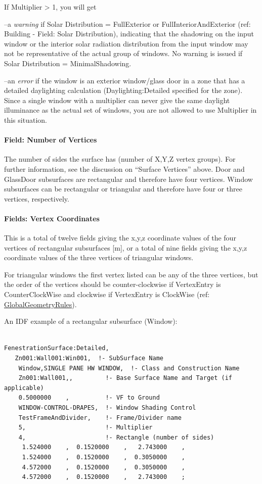 If Multiplier \textgreater{} 1, you will get

--a \emph{warning} if Solar Distribution = FullExterior or FullInteriorAndExterior (ref: Building - Field: Solar Distribution), indicating that the shadowing on the input window or the interior solar radiation distribution from the input window may not be representative of the actual group of windows. No warning is issued if Solar Distribution = MinimalShadowing.

--an \emph{error} if the window is an exterior window/glass door in a zone that has a detailed daylighting calculation (Daylighting:Detailed specified for the zone). Since a single window with a multiplier can never give the same daylight illuminance as the actual set of windows, you are not allowed to use Multiplier in this situation.

\paragraph{Field: Number of Vertices}\label{field-number-of-vertices-4}

The number of sides the surface has (number of X,Y,Z vertex groups). For further information, see the discussion on ``Surface Vertices'' above. Door and GlassDoor subsurfaces are rectangular and therefore have four vertices. Window subsurfaces can be rectangular or triangular and therefore have four or three vertices, respectively.

\paragraph{Fields: Vertex Coordinates}\label{fields-vertex-coordinates}

This is a total of twelve fields giving the x,y,z coordinate values of the four vertices of rectangular subsurfaces {[}m{]}, or a total of nine fields giving the x,y,z coordinate values of the three vertices of triangular windows.

For triangular windows the first vertex listed can be any of the three vertices, but the order of the vertices should be counter-clockwise if VertexEntry is CounterClockWise and clockwise if VertexEntry is ClockWise (ref: \hyperref[globalgeometryrules]{GlobalGeometryRules}).

An IDF example of a rectangular subsurface (Window):

\begin{lstlisting}

FenestrationSurface:Detailed,
   Zn001:Wall001:Win001,  !- SubSurface Name
    Window,SINGLE PANE HW WINDOW,  !- Class and Construction Name
    Zn001:Wall001,,         !- Base Surface Name and Target (if applicable)
    0.5000000    ,          !- VF to Ground
    WINDOW-CONTROL-DRAPES,  !- Window Shading Control
    TestFrameAndDivider,    !- Frame/Divider name
    5,                      !- Multiplier
    4,                      !- Rectangle (number of sides)
     1.524000    ,  0.1520000    ,   2.743000    ,
     1.524000    ,  0.1520000    ,  0.3050000    ,
     4.572000    ,  0.1520000    ,  0.3050000    ,
     4.572000    ,  0.1520000    ,   2.743000    ;
\end{lstlisting}

